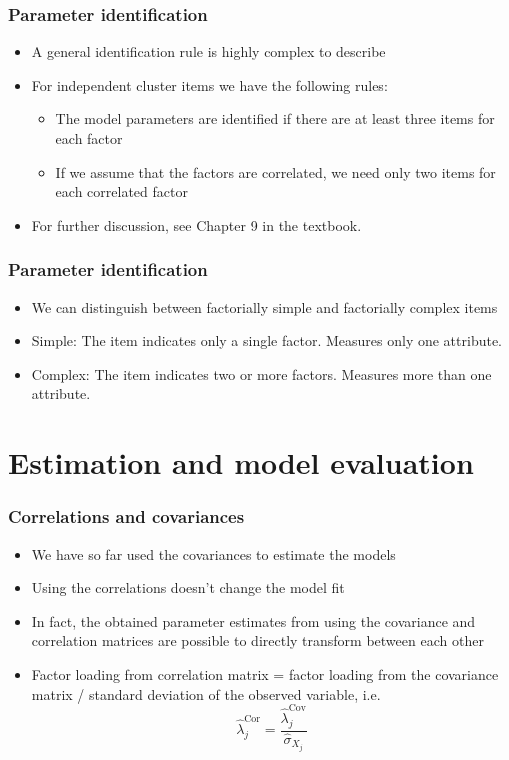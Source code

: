\documentclass[compress]{beamer}
\begin{document}
\begin{frame}[fragile]
\frametitle{Parameter identification}
\begin{itemize}
\item A general identification rule is highly complex to describe
\item For independent cluster items we have the following rules:
\begin{itemize}
\item The model parameters are identified if there are at least three items for each factor
\item If we assume that the factors are correlated, we need only two items for each correlated factor
\end{itemize}
\item For further discussion, see Chapter 9 in the textbook.
\end{itemize}
\end{frame}

\begin{frame}[fragile]
\frametitle{Parameter identification}
\begin{itemize}
\item We can distinguish between factorially simple and factorially complex items
\item Simple: The item indicates only a single factor. Measures only one attribute.
\item Complex: The item indicates two or more factors. Measures more than one attribute.
\end{itemize}
\end{frame}


\section*{Estimation and model evaluation}
\begin{frame}[fragile]
\frametitle{Correlations and covariances}
\begin{itemize}
\item We have so far used the covariances to estimate the models
\item Using the correlations doesn't change the model fit
\item In fact, the obtained parameter estimates from using the covariance and correlation matrices are possible to directly transform between each other
\item Factor loading from correlation matrix = factor loading from the covariance matrix / standard deviation of the observed variable, i.e.
\[
\hat{\lambda}_j^{\text{Cor}} = \frac{\hat{\lambda}_j^{\text{Cov}}}{\hat{\sigma}_{X_j}}
\]
\end{itemize}
\end{frame}
\end{document}
